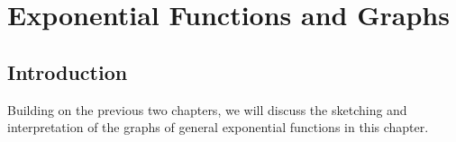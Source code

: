 \chapter{Exponential Functions and Graphs}
\label{m:fg:e11}

\section{Introduction}
Building on the previous two chapters, we will discuss the sketching
and interpretation of the graphs of general exponential functions in
this chapter.




